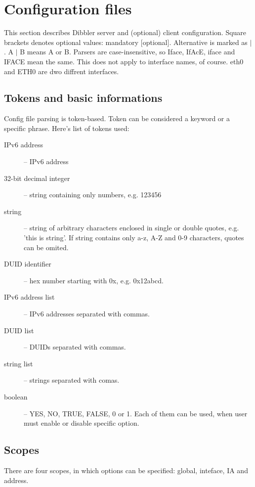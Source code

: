 
\section{Configuration files}

This section describes Dibbler server and (optional) client
configuration. Square brackets denotes optional values: mandatory
[optional]. Alternative is marked as $\mid$. A $\mid$ B means A or
B. Parsers are case-insensitive, so Iface, IfAcE, iface and IFACE mean
the same. This does not apply to interface names, of course. eth0 and
ETH0 are dwo diffrent interfaces.

\subsection{Tokens and basic informations}
Config file parsing is token-based. Token can be considered a keyword
or a specific phrase. Here's list of tokens used:
\begin{description}
\item[IPv6 address] -- IPv6 address 
\item[32-bit decimal integer] -- string containing only numbers, e.g. 123456
\item[string] -- string of arbitrary characters enclosed in single or double
  quotes, e.g. 'this is string'. If string contains only a-z, A-Z and
  0-9 characters, quotes can be omited.
\item[DUID identifier] -- hex number starting with 0x, e.g. 0x12abcd.
\item[IPv6 address list] -- IPv6 addresses separated with commas.
\item[DUID list] -- DUIDs separated with commas.
\item[string list] -- strings separated with comas.
\item[boolean] -- YES, NO, TRUE, FALSE, 0 or 1. Each of them can be
  used, when user must enable or disable specific option.
\end{description}

\subsection{Scopes}
There are four scopes, in which options can be specified: global,
inteface, IA and address.

